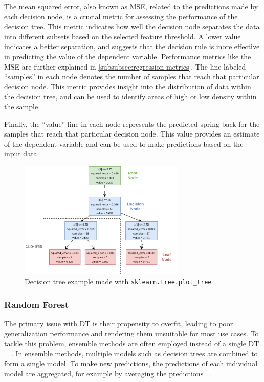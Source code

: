 {The mean squared error, also known as MSE, related to the predictions made by each decision node, is a crucial metric
for assessing the performance of the decision tree.
This metric indicates how well the decision node separates the data into different subsets based on the selected
feature threshold.
A lower value indicates a better separation, and suggests that the decision rule is more effective in predicting the
value of the dependent variable.
Performance metrics like the \ac{MSE} are further explained in \ref{subsubsec:regression-metrics}.
The line labeled ``samples'' in each node denotes the number of samples that reach that particular decision node.
This metric provides insight into the distribution of data within the decision tree, and can be used to identify
areas of high or low density within the sample.

Finally, the ``value'' line in each node represents the predicted spring back for the samples that reach that
particular decision node.
This value provides an estimate of the dependent variable and can be used to make predictions based on the input data.

\begin{figure}[]
    \begin{tcolorbox}[arc=0pt,boxrule=0.5pt]
        \centering
        \includegraphics[width=0.7\textwidth]{chap4/images/decision_tree_example}
    \end{tcolorbox}
    \caption{Decision tree example made with \texttt{sklearn.tree.plot\_tree}~\cite{scikit-learn}.
    }
    \label{fig:dt-example}
\end{figure}

\subsubsection{Random Forest}\label{subsubsec:random-forests}
The primary issue with DT is their propensity to overfit, leading to poor generalization
performance and rendering them unsuitable for most use cases.
To tackle this problem, ensemble methods are often employed instead of a single
DT
~\cite[p. 83]{muller_introductionmachinelearning_2016}~\cite[p. 251]{liu_newmachinelearning_2012}.
In ensemble methods, multiple models such as decision trees are combined to form a single model.
To make new predictions, the predictions of each individual model are aggregated, for example by averaging the
predictions
~\cite[p. 222]{boehmke2019hands}.

}

